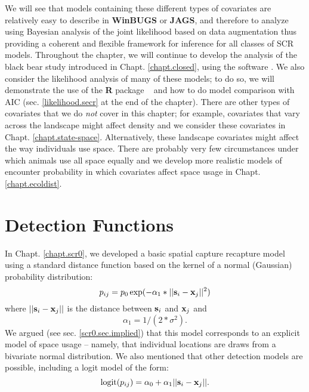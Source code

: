 We will see that models containing these different types of
covariates are relatively easy to describe in {\bf WinBUGS} or
{\bf JAGS}, and
therefore to analyze using Bayesian analysis of the joint likelihood
based on data augmentation thus providing a coherent and flexible
framework for inference for all classes of SCR models.  Throughout the
chapter, we will continue to develop the analysis of the black bear
study introduced in Chapt. \ref{chapt.closed}, using the software
\jags.  We also
consider the likelihood analysis of many of these models; to do so, we
will demonstrate the use of the {\bf R} package \secr~ and how to do model
comparison with AIC (sec. \ref{likelihood.secr} at the end of the chapter).
There are other types of covariates that we do {\it not} cover in this
chapter; for example, covariates that vary across the
landscape might affect density and we consider these covariates in
Chapt. \ref{chapt.state-space}.
Alternatively, these landscape covariates might affect the way individuals use
space. There are probably very few circumstances under which animals use all 
space equally and we develop more realistic models of encounter
probability in which covariates affect space usage in Chapt. \ref{chapt.ecoldist}.


\section{Detection Functions}
\label{covs.sec.detfunc}

In Chapt. \ref{chapt.scr0}, we developed a basic spatial capture
recapture model using a standard distance function based on the kernel
of a normal (Gaussian) probability distribution:
\[
p_{ij} = p_{0} \exp(-\alpha_{1} *||{\bf s}_{i}-{\bf x}_{j}||^2)
\]
where $||{\bf s}_{i}-{\bf x}_{j}||$ is the distance between ${\bf
  s}_{i}$ and ${\bf x}_{j}$ and
\[
\alpha_{1} = 1/(2*\sigma^2).
\]
We argued (see sec. \ref{scr0.sec.implied}) that this model corresponds to
an explicit model of space usage -- namely, that individual locations
are draws from a bivariate normal distribution. We also mentioned that
other detection models are possible, including a logit model of the
form:
\begin{equation}
	\mbox{logit}(p_{ij}) = \alpha_{0} + \alpha_1 ||{\bf s}_{i}-{\bf x}_{j} ||.
\label{covariates.eq.logit}
\end{equation}

